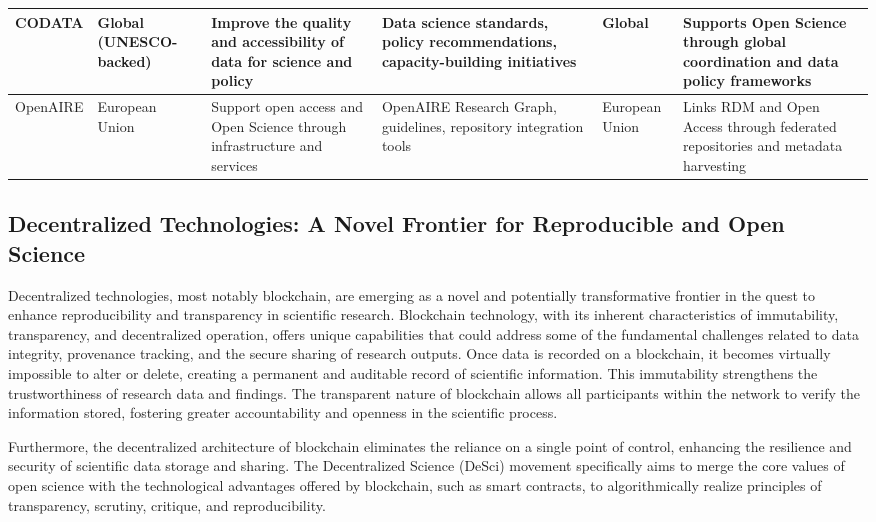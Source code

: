 \documentclass{article}
\begin{document}
\begin{table}[H]
\begin{tabularx}{\textwidth}{|X|X|X|X|X|X|}
        \hline
        CODATA                             & Global (UNESCO-backed)      & Improve the quality and accessibility of data for science and policy         & Data science standards, policy recommendations, capacity-building initiatives & Global                               & Supports Open Science through global coordination and data policy frameworks     \\
        \hline
        OpenAIRE                           & European Union              & Support open access and Open Science through infrastructure and services     & OpenAIRE Research Graph, guidelines, repository integration tools             & European Union                       & Links RDM and Open Access through federated repositories and metadata harvesting \\
        \hline
    \end{tabularx}
\end{table}


\subsection{Decentralized Technologies: A Novel Frontier for Reproducible and Open Science}

Decentralized technologies, most notably blockchain, are emerging as a novel and potentially transformative frontier in the quest to enhance reproducibility and transparency in scientific research. Blockchain technology, with its inherent characteristics of immutability, transparency, and decentralized operation, offers unique capabilities that could address some of the fundamental challenges related to data integrity, provenance tracking, and the secure sharing of research outputs. Once data is recorded on a blockchain, it becomes virtually impossible to alter or delete, creating a permanent and auditable record of scientific information. This immutability strengthens the trustworthiness of research data and findings. The transparent nature of blockchain allows all participants within the network to verify the information stored, fostering greater accountability and openness in the scientific process.

Furthermore, the decentralized architecture of blockchain eliminates the reliance on a single point of control, enhancing the resilience and security of scientific data storage and sharing. The Decentralized Science (DeSci) movement specifically aims to merge the core values of open science with the technological advantages offered by blockchain, such as smart contracts, to algorithmically realize principles of transparency, scrutiny, critique, and reproducibility.
\end{document}
